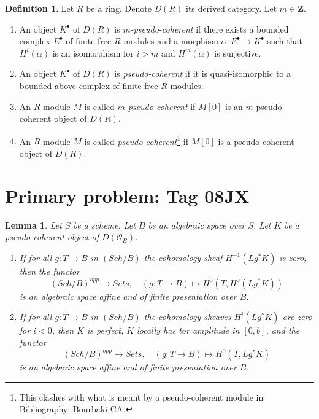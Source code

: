 \documentclass{amsart}
\theoremstyle{plain}
\newtheorem{lemma}[subsection]{Lemma}
\theoremstyle{definition}
\newtheorem{definition}[subsection]{Definition}
\theoremstyle{remark}
\numberwithin{equation}{subsection}
\def\Sch{\mathit{Sch}}
\begin{document}
\begin{definition}
\label{more-algebra-definition-pseudo-coherent}
Let $R$ be a ring. Denote $D(R)$ its derived category.
Let $m \in \mathbf{Z}$.
\begin{enumerate}
\item An object $K^\bullet$ of $D(R)$ is {\it $m$-pseudo-coherent}
if there exists a bounded complex $E^\bullet$ of finite free $R$-modules
and a morphism $\alpha : E^\bullet \to K^\bullet$ such that
$H^i(\alpha)$ is an isomorphism for $i > m$ and $H^m(\alpha)$
is surjective.
\item An object $K^\bullet$ of $D(R)$ is {\it pseudo-coherent}
if it is quasi-isomorphic to a bounded above complex of finite
free $R$-modules.
\item An $R$-module $M$ is called {\it $m$-pseudo-coherent}
if $M[0]$ is an $m$-pseudo-coherent object of $D(R)$.
\item An $R$-module $M$ is called
{\it pseudo-coherent}\footnote{This clashes with what is meant by
a pseudo-coherent module in \href{https://stacks.math.columbia.edu/bibliography}{Bibliography: Bourbaki-CA}.}
if $M[0]$ is a pseudo-coherent object of $D(R)$.
\end{enumerate}
\end{definition}

\section*{Primary problem: Tag 08JX}
\begin{lemma}
\label{lemma-cohomology-perfect-complex}
Let $S$ be a scheme. Let $B$ be an algebraic space over $S$.
Let $K$ be a pseudo-coherent object of $D(\mathcal{O}_B)$.
\begin{enumerate}
\item If for all $g : T \to B$ in $(\Sch/B)$ the cohomology sheaf
$H^{-1}(Lg^*K)$ is zero, then the functor
$$
(\Sch/B)^{opp} \longrightarrow \textit{Sets},\quad
(g : T \to B) \longmapsto H^0(T, H^0(Lg^*K))
$$
is an algebraic space affine and of finite presentation over $B$.
\item If for all $g : T \to B$ in $(\Sch/B)$ the cohomology sheaves
$H^i(Lg^*K)$ are zero for $i < 0$, then $K$ is perfect,
$K$ locally has tor amplitude in $[0, b]$, and the functor
$$
(\Sch/B)^{opp} \longrightarrow \textit{Sets},\quad
(g : T \to B) \longmapsto H^0(T, Lg^*K)
$$
is an algebraic space affine and of finite presentation over $B$.
\end{enumerate}
\end{lemma}
\end{document}
